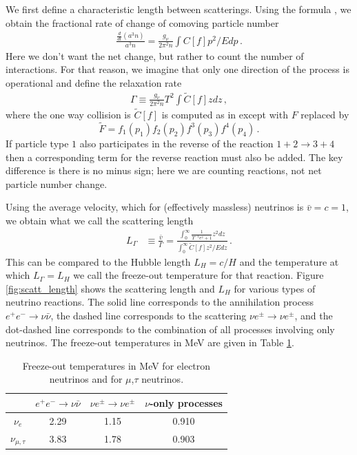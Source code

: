We first define a characteristic length between scatterings. Using the formula , we obtain the fractional rate of change of comoving particle number
\begin{align}
\frac{\frac{d}{dt}(a^3 n)}{a^3n}=\frac{g_\nu}{2\pi^2n}\int C[f]p^2/Edp\,.
\end{align}
Here we don't want the net change, but rather to count the number of interactions. For that reason, we imagine that only one direction of the process is operational and define the relaxation rate
\begin{align}
\Gamma\equiv\frac{g_\nu}{2\pi^2n}T^2\int \tilde C[f]zdz\,,
\end{align}
where the one way collision is $\tilde C[f]$ is computed as in  except with $F$ replaced by 
\begin{equation}
\tilde F=f_1(p_1)f_2(p_2)f^3(p_3)f^4(p_4)\,.
\end{equation}
If particle type $1$ also participates in the reverse of the reaction $1+2\rightarrow 3+4$ then a corresponding term for the reverse reaction must also be added. The key difference is there is no minus sign; here we are counting reactions, not net particle number change.

Using the average velocity, which for (effectively massless) neutrinos is $\bar v=c=1$, we obtain what we call the scattering length
\begin{align}
L_\Gamma&\equiv\frac{\bar v}{\Gamma}=\frac{\int_0^\infty\frac{1}{\Upsilon^{-1}e^z+1}z^2dz}{\int_0^\infty \tilde C[f] z^2/E dz}\,.
\end{align}
This can be compared to the Hubble length $L_H=c/H$ and the temperature at which $L_\Gamma=L_H$ we call the freeze-out temperature for that reaction. Figure \ref{fig:scatt_length} shows the scattering length and $L_H$ for various types of neutrino reactions. The solid line corresponds to the annihilation process $e^+e^-\rightarrow \nu\bar\nu$, the dashed line corresponds to the scattering $\nu e^\pm\rightarrow \nu e^\pm$, and the dot-dashed line corresponds to the combination of all processes involving only neutrinos. The freeze-out temperatures in MeV are given in Table \ref{table:freeze-out_temp}.

\begin{table}[ht]
\centering 
\begin{tabular}{|c|c|c|c|}
\hline
 & $e^+e^-\rightarrow \nu\bar\nu$ & $\nu e^\pm\rightarrow \nu e^\pm$ & $\nu$-only processes\\
\hline
$\nu_e$ &2.29 & 1.15&0.910\\
\hline
$\nu_{\mu,\tau}$ &3.83 & 1.78& 0.903\\
\hline
\end{tabular}
\caption{Freeze-out temperatures in MeV for electron neutrinos and for $\mu$,$\tau$ neutrinos.}
\label{table:freeze-out_temp}
\end{table}

